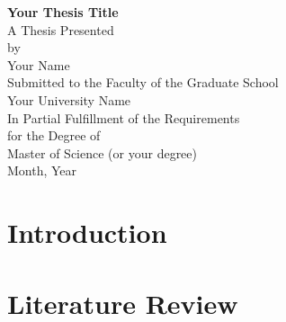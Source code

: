 \documentclass[12pt, a4paper, twoside]{report}
\begin{document}
\begin{titlepage}
  \centering
  \vspace*{\fill}
  \Huge\textbf{Your Thesis Title}\\
  \vspace{0.5in}
  \Large{A Thesis Presented}\\
  \Large{by}\\
  \Large{Your Name}\\
  \vspace{0.5in}
  \Large{Submitted to the Faculty of the Graduate School}\\
  \Large{Your University Name}\\
  \vspace{0.5in}
  \Large{In Partial Fulfillment of the Requirements}\\
  \Large{for the Degree of}\\
  \Large{Master of Science (or your degree)}\\
  \vspace{0.5in}
  \Large{Month, Year}\\
  \vspace*{\fill}
\end{titlepage}

\tableofcontents

\listoffigures
\listoftables

\chapter{Introduction}


\chapter{Literature Review}




\end{document}
